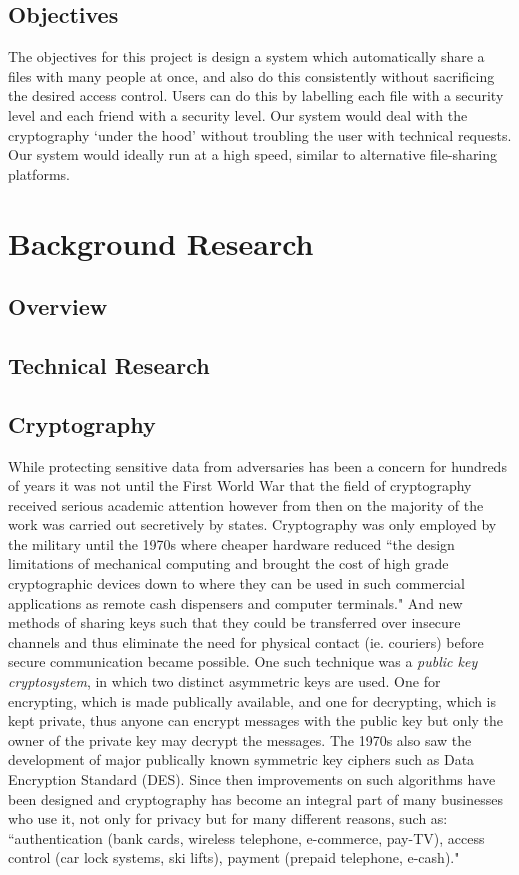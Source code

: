 \documentclass[12pt, titlepage]{article}
\begin{document}
\subsection{Objectives}
The objectives for this project is design a system which automatically share a files with many people at once, and also do this consistently without sacrificing the desired access control. Users can do this by labelling each file with a security level and each friend with a security level. Our system would deal with the cryptography `under the hood' without troubling the user with technical requests. Our system would ideally run at a high speed, similar to alternative file-sharing platforms.

\section{Background Research}
\subsection{Overview}

\subsection{Technical Research}
\subsection*{Cryptography}
While protecting sensitive data from adversaries has been a concern for hundreds of years it was not until the First World War that the field of cryptography received serious academic attention however from then on the majority of the work was carried out secretively by states.\cite{appliedCryptoBook} Cryptography was only employed by the military until the 1970s where cheaper hardware reduced ``the design limitations of mechanical computing and brought the cost of high grade cryptographic devices down to where they can be used in such commercial applications as remote cash dispensers and computer terminals."\cite{newCryptoDirections} And new methods of sharing keys such that they could be transferred over insecure channels and thus eliminate the need for physical contact (ie. couriers) before secure communication became possible. One such technique was a \textit{public key cryptosystem}, in which two distinct asymmetric keys are used. One for encrypting, which is made publically available, and one for decrypting, which is kept private, thus anyone can encrypt messages with the public key but only the owner of the private key may decrypt the messages. The 1970s also saw the development of major publically known symmetric key ciphers such as Data Encryption Standard (DES). Since then improvements on such algorithms have been designed and cryptography has become an integral part of many businesses who use it, not only for privacy but for many different reasons, such as: ``authentication (bank cards, wireless telephone, e-commerce, pay-TV), access control (car lock systems, ski lifts), payment (prepaid telephone, e-cash)."\cite{classicalCryptoBook}
\end{document}
